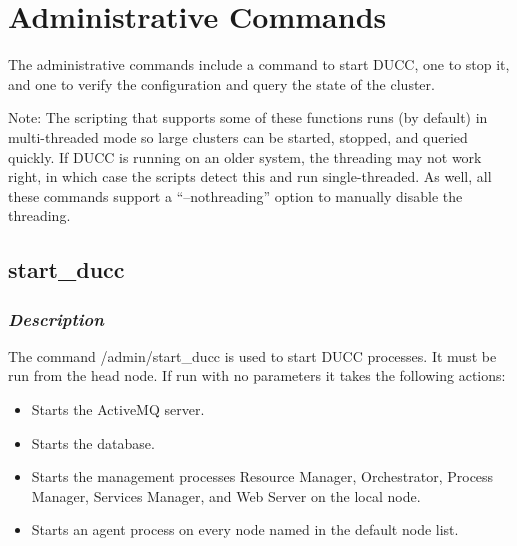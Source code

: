 % 
% 
% 
% 

\section{Administrative Commands}

   The administrative commands include a command to start DUCC, one to stop it, and one to 
   verify the configuration and query the state of the cluster.

   Note: The scripting that supports some of these functions runs (by default) in multi-threaded mode so
   large clusters can be started, stopped, and queried quickly.  If DUCC is running on an older
   system, the threading may not work right, in which case the scripts detect this and run
   single-threaded.  As well, all these commands support a ``--nothreading'' option to manually
   disable the threading.

\subsection{start\_ducc}
\label{subsec:admin.start-ducc}

    \subsubsection{{\em Description}}
    The command \ducchome/admin/start\_ducc is used to start DUCC processes. 
    It must be run from the head node.
    If run with no parameters it takes the following actions:
    \begin{itemize}
      \item Starts the ActiveMQ server.
      \item Starts the database.
      \item Starts the management processes Resource Manager, Orchestrator, Process Manager,      
      Services Manager, and Web Server on the local node.
      \item Starts an agent process on every node named in the default node list. 
    \end{itemize}
    
